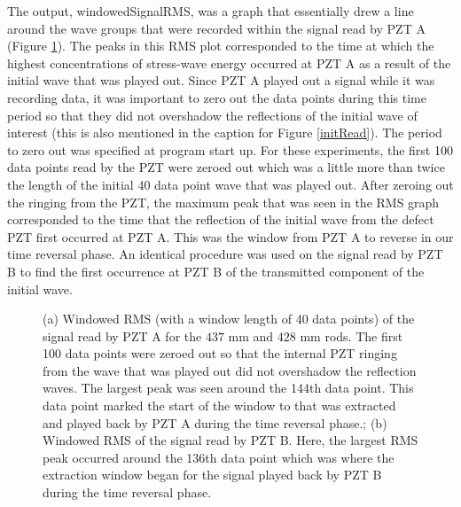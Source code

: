 \documentclass[11pt,letterpaper]{article}%
\begin{document}
The output, windowedSignalRMS, was a graph that essentially drew a line around the wave groups that were recorded within the signal read by PZT A (Figure \ref{windowedRMS}). The peaks in this RMS plot corresponded to the time at which the highest concentrations of stress-wave energy occurred at PZT A as a result of the initial wave that was played out. Since PZT A played out a signal while it was recording data, it was important to zero out the data points during this time period so that they did not overshadow the reflections of the initial wave of interest (this is also mentioned in the caption for Figure \ref{initRead}). The period to zero out was specified at program start up. For these experiments, the first 100 data points read by the PZT were zeroed out which was a little more than twice the length of the initial 40 data point wave that was played out. After zeroing out the ringing from the PZT, the maximum peak that was seen in the RMS graph corresponded to the time that the reflection of the initial wave from the defect PZT first occurred at PZT A. This was the window from PZT A to reverse in our time reversal phase. An identical procedure was used on the signal read by PZT B to find the first occurrence at PZT B of the transmitted component of the initial wave.

\begin{figure}
\begin{subfigmatrix}{2}
\end{subfigmatrix}

   \caption[all]
   { \label{windowedRMS}
(a) Windowed RMS (with a window length of 40 data points) of the signal read by PZT A for the $437$ mm and $428$ mm rods. The first 100 data points were zeroed out so that the internal PZT ringing from the wave that was played out did not overshadow the reflection waves. The largest peak was seen around the 144th data point. This data point marked the start of the window to that was extracted and played back by PZT A during the time reversal phase.;
(b) Windowed RMS of the signal read by PZT B. Here, the largest RMS peak occurred around the 136th data point which was where the extraction window began for the signal played back by PZT B during the time reversal phase.
 }
   \end{figure}
\end{document}
